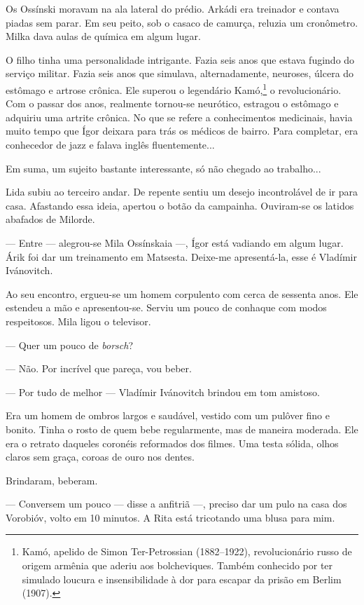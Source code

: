 Os Ossínski moravam na ala lateral do prédio. Arkádi era treinador e
contava piadas sem parar. Em seu peito, sob o casaco de camurça, reluzia
um cronômetro. Milka dava aulas de química em algum lugar.

O filho tinha uma personalidade intrigante. Fazia seis anos que estava
fugindo do serviço militar. Fazia seis anos que simulava,
alternadamente, neuroses, úlcera do estômago e artrose crônica. Ele
superou o legendário Kamó,\footnote{Kamó, apelido de Simon
  Ter-Petrossian (1882--1922), revolucionário russo de origem armênia
  que aderiu aos bolcheviques. Também conhecido por ter simulado loucura
  e insensibilidade à dor para escapar da prisão em Berlim (1907).} o
revolucionário. Com o passar dos anos, realmente tornou-se neurótico,
estragou o estômago e adquiriu uma artrite crônica. No que se refere a
conhecimentos medicinais, havia muito tempo que Ígor deixara para trás
os médicos de bairro. Para completar, era conhecedor de jazz e falava
inglês fluentemente...

Em suma, um sujeito bastante interessante, só não chegado ao trabalho...

Lida subiu ao terceiro andar. De repente sentiu um desejo incontrolável
de ir para casa. Afastando essa ideia, apertou o botão da campainha.
Ouviram-se os latidos abafados de Milorde.

--- Entre --- alegrou-se Mila Ossínskaia ---, Ígor está vadiando em
algum lugar. Árik foi dar um treinamento em Matsesta. Deixe-me
apresentá-la, esse é Vladímir Ivánovitch.

Ao seu encontro, ergueu-se um homem corpulento com cerca de sessenta
anos. Ele estendeu a mão e apresentou-se. Serviu um pouco de conhaque
com modos respeitosos. Mila ligou o televisor.

--- Quer um pouco de \emph{borsch}?

--- Não. Por incrível que pareça, vou beber.

--- Por tudo de melhor --- Vladímir Ivánovitch brindou em tom amistoso.

Era um homem de ombros largos e saudável, vestido com um pulôver fino e
bonito. Tinha o rosto de quem bebe regularmente, mas de maneira
moderada. Ele era o retrato daqueles coronéis reformados dos filmes. Uma
testa sólida, olhos claros sem graça, coroas de ouro nos dentes.

Brindaram, beberam.

--- Conversem um pouco --- disse a anfitriã ---, preciso dar um pulo na
casa dos Vorobióv, volto em 10 minutos. A Rita está tricotando uma blusa
para mim.

